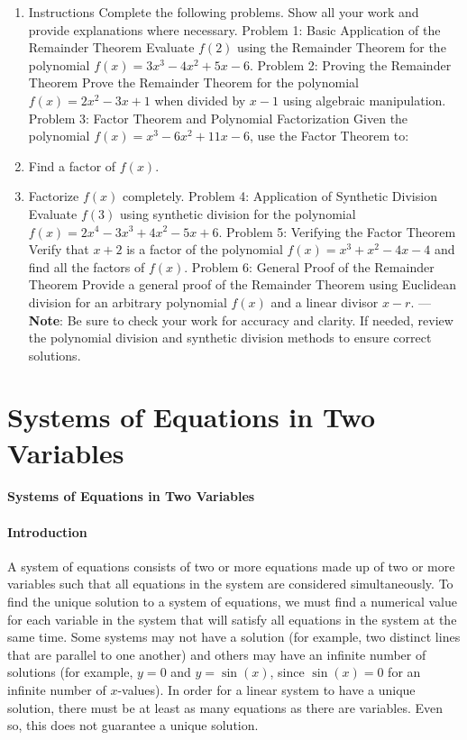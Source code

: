 \begin{enumerate}
    \item Instructions Complete the following problems. Show all your work and provide explanations where necessary. Problem 1: Basic Application of the Remainder Theorem Evaluate $f(2)$ using the Remainder Theorem for the polynomial $f(x) = 3x^3 - 4x^2 + 5x - 6$. Problem 2: Proving the Remainder Theorem Prove the Remainder Theorem for the polynomial $f(x) = 2x^2 - 3x + 1$ when divided by $x - 1$ using algebraic manipulation. Problem 3: Factor Theorem and Polynomial Factorization Given the polynomial $f(x) = x^3 - 6x^2 + 11x - 6$, use the Factor Theorem to:
    \item Find a factor of $f(x)$.
    \item Factorize $f(x)$ completely. Problem 4: Application of Synthetic Division Evaluate $f(3)$ using synthetic division for the polynomial $f(x) = 2x^4 - 3x^3 + 4x^2 - 5x + 6$. Problem 5: Verifying the Factor Theorem Verify that $x + 2$ is a factor of the polynomial $f(x) = x^3 + x^2 - 4x - 4$ and find all the factors of $f(x)$. Problem 6: General Proof of the Remainder Theorem Provide a general proof of the Remainder Theorem using Euclidean division for an arbitrary polynomial $f(x)$ and a linear divisor $x - r$. --- \textbf{Note}: Be sure to check your work for accuracy and clarity. If needed, review the polynomial division and synthetic division methods to ensure correct solutions.
\end{enumerate}

\section{Systems of Equations in Two Variables}
\label{sec:systems-of-equations-in-two-variables}

\paragraph{Systems of Equations in Two Variables}

\paragraph{Introduction}

A system of equations consists of two or more equations made up of two or more variables such that all equations in the system are considered simultaneously. To find the unique solution to a system of equations, we must find a numerical value for each variable in the system that will satisfy all equations in the system at the same time. Some systems may not have a solution (for example, two distinct lines that are parallel to one another) and others may have an infinite number of solutions (for example, $y = 0$ and $y = \sin(x)$, since $\sin(x) = 0$ for an infinite number of $x$-values). In order for a linear system to have a unique solution, there must be at least as many equations as there are variables. Even so, this does not guarantee a unique solution.

